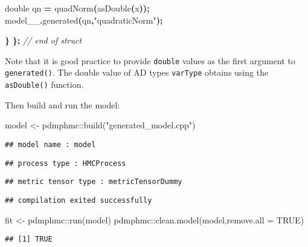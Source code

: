 \documentclass[
]{book}
\newenvironment{Shaded}{\begin{snugshade}}{\end{snugshade}}
\newcommand{\AttributeTok}[1]{\textcolor[rgb]{0.77,0.63,0.00}{#1}}
\newcommand{\CommentTok}[1]{\textcolor[rgb]{0.56,0.35,0.01}{\textit{#1}}}
\newcommand{\ConstantTok}[1]{\textcolor[rgb]{0.00,0.00,0.00}{#1}}
\newcommand{\DataTypeTok}[1]{\textcolor[rgb]{0.13,0.29,0.53}{#1}}
\newcommand{\FunctionTok}[1]{\textcolor[rgb]{0.00,0.00,0.00}{#1}}
\newcommand{\NormalTok}[1]{#1}
\newcommand{\OperatorTok}[1]{\textcolor[rgb]{0.81,0.36,0.00}{\textbf{#1}}}
\newcommand{\OtherTok}[1]{\textcolor[rgb]{0.56,0.35,0.01}{#1}}
\newcommand{\SpecialCharTok}[1]{\textcolor[rgb]{0.00,0.00,0.00}{#1}}
\newcommand{\StringTok}[1]{\textcolor[rgb]{0.31,0.60,0.02}{#1}}
\begin{document}
\begin{Shaded}
\begin{Highlighting}[]
    \DataTypeTok{double}\NormalTok{ qn }\OperatorTok{=}\NormalTok{ quadNorm}\OperatorTok{(}\NormalTok{asDouble}\OperatorTok{(}\NormalTok{x}\OperatorTok{));}
\NormalTok{    model\_\_}\OperatorTok{.}\NormalTok{generated}\OperatorTok{(}\NormalTok{qn}\OperatorTok{,}\StringTok{"quadraticNorm"}\OperatorTok{);}
    
  \OperatorTok{\}} 
\OperatorTok{\};} \CommentTok{// end of struct}
\end{Highlighting}
\end{Shaded}

Note that it is good practice to provide \texttt{double} values as the first argument to \texttt{generated()}. The double value of AD types \texttt{varType} obtains using the \texttt{asDouble()} function.

Then build and run the model:

\begin{Shaded}
\begin{Highlighting}[]
\NormalTok{model }\OtherTok{\textless{}{-}}\NormalTok{ pdmphmc}\SpecialCharTok{::}\FunctionTok{build}\NormalTok{(}\StringTok{"generated\_model.cpp"}\NormalTok{)}
\end{Highlighting}
\end{Shaded}

\begin{verbatim}
## model name : model
\end{verbatim}

\begin{verbatim}
## process type : HMCProcess
\end{verbatim}

\begin{verbatim}
## metric tensor type : metricTensorDummy
\end{verbatim}

\begin{verbatim}
## compilation exited successfully
\end{verbatim}

\begin{Shaded}
\begin{Highlighting}[]
\NormalTok{fit }\OtherTok{\textless{}{-}}\NormalTok{ pdmphmc}\SpecialCharTok{::}\FunctionTok{run}\NormalTok{(model)}
\NormalTok{pdmphmc}\SpecialCharTok{::}\FunctionTok{clean.model}\NormalTok{(model,}\AttributeTok{remove.all =} \ConstantTok{TRUE}\NormalTok{)}
\end{Highlighting}
\end{Shaded}

\begin{verbatim}
## [1] TRUE
\end{verbatim}
\end{document}
